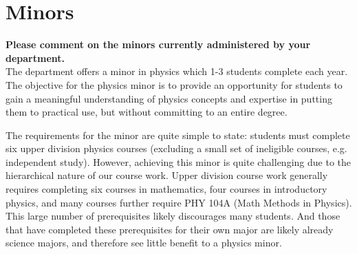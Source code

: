 \documentclass[12pt]{article}
\begin{document}
\newpage	
\section{Minors}
{\bf Please comment on the minors currently administered by your
  department.}\\[3pt]




\noindent
The department offers a minor in physics which 1-3 students complete
each year.  The objective for the physics minor is to provide an
opportunity for students to gain a meaningful understanding of physics
concepts and expertise in putting them to practical use, but without
committing to an entire degree.

The requirements for the minor are quite simple to state: students
must complete six upper division physics courses (excluding a small
set of ineligible courses, e.g. independent study).  However,
achieving this minor is quite challenging due to the hierarchical
nature of our course work.  Upper division course work generally
requires completing six courses in mathematics, four courses in
introductory physics, and many courses further require PHY 104A (Math
Methods in Physics).  This large number of prerequisites likely
discourages many students.  And those that have completed these
prerequisites for their own major are likely already science majors,
and therefore see little benefit to a physics minor.
\end{document}
